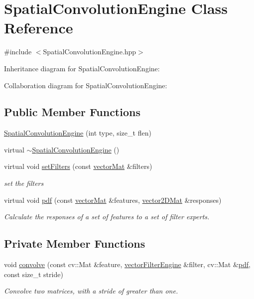 \hypertarget{classSpatialConvolutionEngine}{}\section{Spatial\+Convolution\+Engine Class Reference}
\label{classSpatialConvolutionEngine}


{\ttfamily \#include $<$Spatial\+Convolution\+Engine.\+hpp$>$}



Inheritance diagram for Spatial\+Convolution\+Engine\+:


Collaboration diagram for Spatial\+Convolution\+Engine\+:
\subsection*{Public Member Functions}
\begin{DoxyCompactItemize}
\item 
\hyperlink{classSpatialConvolutionEngine_a934e9613ba487297befd6e064bbd5d7a}{Spatial\+Convolution\+Engine} (int type, size\+\_\+t flen)
\item 
virtual \hyperlink{classSpatialConvolutionEngine_a07b28be0c28a1c47bc6f2a7459155802}{$\sim$\+Spatial\+Convolution\+Engine} ()
\item 
virtual void \hyperlink{classSpatialConvolutionEngine_ad27aad7b65dfa3ec6a617eed96c01d9c}{set\+Filters} (const \hyperlink{types_8hpp_a3207a7addcfa415d1c83622febcb1e9b}{vector\+Mat} \&filters)
\begin{DoxyCompactList}\small\item\em set the filters \end{DoxyCompactList}\item 
virtual void \hyperlink{classSpatialConvolutionEngine_a6db3b5e9428ee74e1b4e9e7f7111cad5}{pdf} (const \hyperlink{types_8hpp_a3207a7addcfa415d1c83622febcb1e9b}{vector\+Mat} \&features, \hyperlink{types_8hpp_a33cacb85be7b8df3dc0b67d5d849f4cc}{vector2\+D\+Mat} \&responses)
\begin{DoxyCompactList}\small\item\em Calculate the responses of a set of features to a set of filter experts. \end{DoxyCompactList}\end{DoxyCompactItemize}
\subsection*{Private Member Functions}
\begin{DoxyCompactItemize}
\item 
void \hyperlink{classSpatialConvolutionEngine_a3c31cd8797e4c99ccf68dfa558319750}{convolve} (const cv\+::\+Mat \&feature, \hyperlink{types_8hpp_a429d786862fa9bc087b66651599c66dd}{vector\+Filter\+Engine} \&filter, cv\+::\+Mat \&\hyperlink{classSpatialConvolutionEngine_a6db3b5e9428ee74e1b4e9e7f7111cad5}{pdf}, const size\+\_\+t stride)
\begin{DoxyCompactList}\small\item\em Convolve two matrices, with a stride of greater than one. \end{DoxyCompactList}\end{DoxyCompactItemize}
